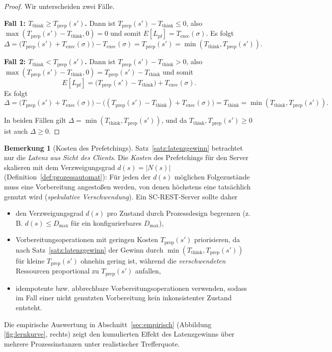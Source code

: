 ﻿\documentclass[a4paper,12pt]{article}
\theoremstyle{definition}
\newtheorem{bemerkung}{Bemerkung}
\begin{document}
\begin{proof}
	Wir unterscheiden zwei Fälle.

	\textbf{Fall 1: $T_{\mathrm{think}} \geq T_{\mathrm{prep}}(s')$.} Dann ist
	$T_{\mathrm{prep}}(s') - T_{\mathrm{think}} \leq 0$, also
	$\max(T_{\mathrm{prep}}(s')-T_{\mathrm{think}},0) = 0$ und somit
	$E[L_{\mathrm{pf}}] = T_{\mathrm{exec}}(\sigma)$. Es folgt
	\[
		\Delta = \bigl(T_{\mathrm{prep}}(s') + T_{\mathrm{exec}}(\sigma)\bigr)
		- T_{\mathrm{exec}}(\sigma) = T_{\mathrm{prep}}(s')
		= \min(T_{\mathrm{think}}, T_{\mathrm{prep}}(s')).
	\]

	\textbf{Fall 2: $T_{\mathrm{think}} < T_{\mathrm{prep}}(s')$.} Dann ist
	$T_{\mathrm{prep}}(s')-T_{\mathrm{think}} > 0$, also
	$\max(T_{\mathrm{prep}}(s')-T_{\mathrm{think}},0) = T_{\mathrm{prep}}(s')-T_{\mathrm{think}}$
	und somit
	\[
		E[L_{\mathrm{pf}}] = \bigl(T_{\mathrm{prep}}(s')-T_{\mathrm{think}}\bigr)
		+ T_{\mathrm{exec}}(\sigma).
	\]
	Es folgt
	\[
		\Delta = \bigl(T_{\mathrm{prep}}(s')+T_{\mathrm{exec}}(\sigma)\bigr)
		- \bigl((T_{\mathrm{prep}}(s')-T_{\mathrm{think}})+T_{\mathrm{exec}}(\sigma)\bigr)
		= T_{\mathrm{think}}
		= \min(T_{\mathrm{think}}, T_{\mathrm{prep}}(s')).
	\]

	In beiden Fällen gilt $\Delta = \min(T_{\mathrm{think}}, T_{\mathrm{prep}}(s'))$, und
	da $T_{\mathrm{think}}, T_{\mathrm{prep}}(s') \geq 0$ ist auch $\Delta \geq 0$.
	\qedhere
\end{proof}

\begin{bemerkung}[Kosten des Prefetchings]
	\label{bem:prefetch-kosten}
	Satz~\ref{satz:latenzgewinn} betrachtet nur die \emph{Latenz aus Sicht des Clients}.
	Die \emph{Kosten} des Prefetchings für den Server skalieren mit dem
	Verzweigungsgrad $d(s)=|N(s)|$ (Definition~\ref{def:prozessautomat}): Für jeden der
	$d(s)$ möglichen Folgezustände muss eine Vorbereitung angestoßen werden, von denen
	höchstens eine tatsächlich genutzt wird (\emph{spekulative Verschwendung}). Ein
	SC-REST-Server sollte daher
	\begin{itemize}
		\item den Verzweigungsgrad $d(s)$ pro Zustand durch Prozessdesign begrenzen
		      (z.\,B. $d(s) \leq D_{\max}$ für ein konfigurierbares $D_{\max}$),
		\item Vorbereitungsoperationen mit geringen Kosten $T_{\mathrm{prep}}(s')$
		      priorisieren, da nach Satz~\ref{satz:latenzgewinn} der Gewinn durch
		      $\min(T_{\mathrm{think}},T_{\mathrm{prep}}(s'))$ für kleine
		      $T_{\mathrm{prep}}(s')$ ohnehin gering ist, während die
		      \emph{verschwendeten} Ressourcen proportional zu $T_{\mathrm{prep}}(s')$
		      anfallen,
		\item idempotente bzw. abbrechbare Vorbereitungsoperationen verwenden, sodass im
		      Fall einer nicht genutzten Vorbereitung kein inkonsistenter Zustand
		      entsteht.
	\end{itemize}
	Die empirische Auswertung in Abschnitt~\ref{sec:empirisch} (Abbildung
	\ref{fig:lernkurve}, rechts) zeigt den kumulierten Effekt des Latenzgewinns über
	mehrere Prozessinstanzen unter realistischer Trefferquote.
\end{bemerkung}
\end{document}
